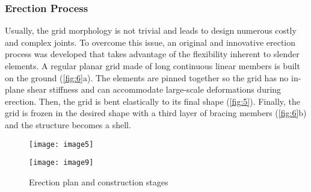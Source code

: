 \subsubsection{Erection Process}
Usually, the grid morphology is not trivial and leads to design numerous costly and complex joints. To overcome this issue, an original and innovative erection process was developed that takes advantage of the flexibility inherent to slender elements. A regular planar grid made of long continuous linear members is built on the ground (\autoref{fig:6}a). The elements are pinned together so the grid has no in-plane shear stiffness and can accommodate large-scale deformations during erection. Then, the grid is bent elastically to its final shape (\autoref{fig:5}). Finally, the grid is frozen in the desired shape with a third layer of bracing members (\autoref{fig:6}b) and the structure becomes a shell.
\begin{figure}[t]
	\begin{minipage}[b]{.70\linewidth}
		\centering\texttt{[image: image5]}
	\end{minipage} \hfill
	\begin{minipage}[b]{.25\linewidth}
		\centering\texttt{[image: image9]}	
	\end{minipage}
	\vspace{0.5cm}
	\caption{Erection plan and construction stages}\label{fig:6}
\end{figure}



